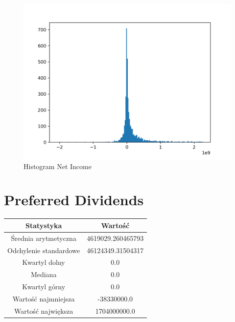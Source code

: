 \documentclass{article}
\begin{document}
\begin{figure}[h!]
    \includegraphics[width=\linewidth]{variables/Net Income.png}
    \caption{Histogram Net Income }
\end{figure}\section{ Preferred Dividends }

\begin{center}
    \begin{tabular}{|c | c|} 
    \hline
    Statystyka & Wartość \\
    \hline\hline
    Średnia arytmetyczna & 4619029.260465793 \\ 
    \hline
    Odchylenie standardowe & 46124349.31504317 \\
    \hline
    Kwartyl dolny & 0.0 \\
    \hline
    Mediana & 0.0 \\
    \hline
    Kwartyl górny & 0.0 \\
    \hline
    Wartość najmniejsza & -38330000.0 \\
    \hline
    Wartość największa & 1704000000.0 \\
    \hline
   \end{tabular}
\end{center}
\end{document}
